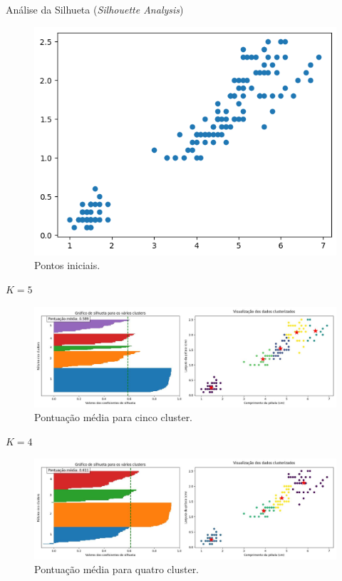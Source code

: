 \documentclass{beamer}
\begin{document}
\begin{frame}{Análise da Silhueta  (\textit{Silhouette Analysis})}
    \begin{figure}
    \centering
    \includegraphics[width=0.6\linewidth]{imagens/output.png}
    \caption{Pontos iniciais.}
    \label{fig:semcluster}
\end{figure}
\end{frame}
\begin{frame}{\(K=5\)}
    \begin{figure}
    \centering
    \includegraphics[width=1\linewidth]{imagens/Silhouette_analysis_5.jpg}
    \caption{Pontuação média para cinco cluster.}
    \label{fig:silueta5}
\end{figure}
\end{frame}
\begin{frame}{\(K=4\)}
    \begin{figure}
    \centering
    \includegraphics[width=1\linewidth]{imagens/Silhouette_analysis_4.jpg}
    \caption{Pontuação média para quatro cluster.}
    \label{fig:silueta4}
\end{figure}
\end{frame}
\end{document}
